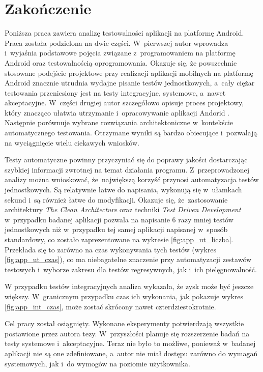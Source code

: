 \chapter*{Zakończenie}
\label{zakonczenie}

Poniższa praca zawiera analizę testowalności aplikacji na platformę Android. Praca została podzielona na dwie części. W~pierwszej autor wprowadza i~wyjaśnia podstawowe pojęcia związane z~programowaniem na platformę Android oraz testowalnością oprogramowania. Okazuje się, że powszechnie stosowane podejście projektowe przy realizacji aplikacji mobilnych na platformę Android znacznie utrudnia wydajne pisanie testów jednostkowych, a~cały ciężar testowania przeniesiony jest na testy integracyjne, systemowe, a~nawet akceptacyjne. W~części drugiej autor szczegółowo opisuje proces projektowy, który znacząco ułatwia utrzymanie i~opracowywanie aplikacji Andorid \cite{website:cecil:blog}. Następnie porównuje wybrane rozwiązania architektoniczne w~kontekście automatycznego testowania. Otrzymane wyniki są bardzo obiecujące i~pozwalają na wyciągnięcie wielu ciekawych wniosków.

Testy automatyczne powinny przyczyniać się do poprawy jakości dostarczając szybkiej informacji zwrotnej na temat działania programu. Z~przeprowadzonej analizy można wnioskować, że~największą korzyść przynosi automatyzacja testów jednostkowych. Są relatywnie łatwe do napisania, wykonują się w~ułamkach sekund i~są również łatwe do modyfikacji. Okazuje się, że~zastosowanie architektury \textit{The Clean Architecture} oraz techniki \textit{Test Driven Development} w~przypadku badanej aplikacji pozwala na napisanie 6 razy mniej testów jednostkowych niż w~przypadku tej samej aplikacji napisanej w~sposób standardowy, co zostało zaprezentowane na wykresie \ref{fig:app_ut_liczba}. Przekłada się to zarówno na czas wykonywania tych testów (wykres \ref{fig:app_ut_czas}), co ma niebagatelne znaczenie przy automatyzacji zestawów testowych i~wyborze zakresu dla testów regresywnych, jak i~ich pielęgnowalność. 

W przypadku testów integracyjnych analiza wykazała, że zysk może być jeszcze większy. W~granicznym przypadku czas ich wykonania, jak pokazuje wykres \ref{fig:app_int_czas}, może zostać skrócony nawet czterdziestokrotnie.

Cel pracy został osiągnięty. Wykonane eksperymenty potwierdzają wszystkie postawione przez autora tezy. W~przyszłości planuje się rozszerzenie badań na testy systemowe i~akceptacyjne. Teraz nie było to możliwe, ponieważ w~badanej aplikacji nie są one zdefiniowane, a~autor nie miał dostępu zarówno do wymagań systemowych, jak i~do wymogów na poziomie użytkownika. 


